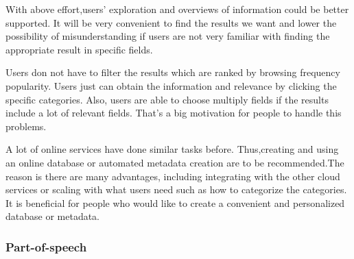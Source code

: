 With above effort,users' exploration and overviews of information could be better supported. 
It will be very convenient to find the results we want and lower the possibility of misunderstanding if users are not very familiar with finding the appropriate result in specific fields.

\cite{TunThuraThet2010} Users don not have to filter the results which are ranked by browsing frequency popularity. 
Users just can obtain the information and relevance by clicking the specific categories. 
Also, users are able to choose multiply fields if the results include a lot of relevant fields. 
That's a big motivation for people to handle this problems. 

A lot of online services have done similar tasks before.
Thus,creating and using an online database or automated metadata creation are to be recommended.The reason is there are many advantages, including integrating with the other cloud services or scaling with what users need such as how to categorize the categories.
It is beneficial for people who would like to create a convenient and personalized database or metadata.\\


\subsubsection*{Part-of-speech}

